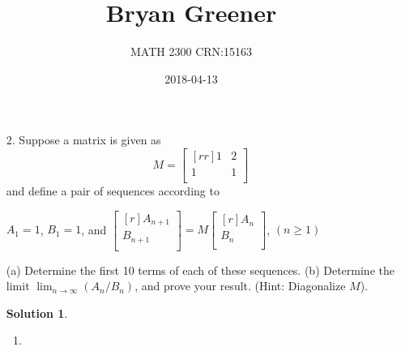 \documentclass[12pt]{article}
\title{Bryan Greener}
\author{MATH 2300 CRN:15163}
\date{2018-04-13}
\theoremstyle{definition}
\newtheorem*{solution}{Solution} %
\theoremstyle{plain}
\begin{document}
\maketitle

\TabPositions{4cm}

\begin{enumerate}
\item[2.]Suppose a matrix is given as
\[ M=\begin{bmatrix}[rr]1&2\\1&1\\\end{bmatrix} \]
and define a pair of sequences according to
\begin{center}
$A_1=1$, $B_1=1$, and $\begin{bmatrix}[r]A_{n+1}\\B_{n+1}\\\end{bmatrix}=M\begin{bmatrix}[r]A_n\\B_n\\\end{bmatrix}$, $(n\geq 1)$
\end{center}
(a) Determine the first 10 terms of each of these sequences. (b) Determine the limit $\lim_{n\rightarrow\infty}(A_n/B_n)$, and prove your result. (Hint: Diagonalize $M$).
\begin{solution}
\begin{enumerate}
\item

\end{enumerate}
\end{solution}
\end{enumerate}
\end{document}

